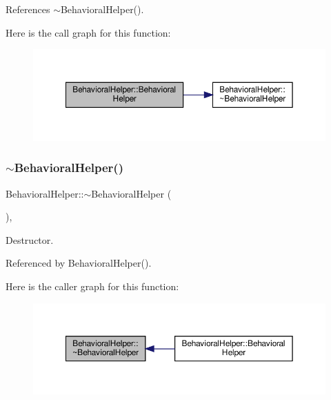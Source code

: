 References $\sim$\+Behavioral\+Helper().

Here is the call graph for this function\+:
\nopagebreak
\begin{figure}[H]
\begin{center}
\leavevmode
\includegraphics[width=350pt]{dd/db2/classBehavioralHelper_ac80988de2f81cb9392beae59b1068542_cgraph}
\end{center}
\end{figure}
\mbox{\label{classBehavioralHelper_a5cf976c4c31781dc5348f829f2ee734d}} 
\subsubsection{\texorpdfstring{$\sim$\+Behavioral\+Helper()}{~BehavioralHelper()}}
{\footnotesize\ttfamily Behavioral\+Helper\+::$\sim$\+Behavioral\+Helper (\begin{DoxyParamCaption}{ }\end{DoxyParamCaption})\hspace{0.3cm}{\ttfamily [virtual]}, {\ttfamily [default]}}



Destructor. 



Referenced by Behavioral\+Helper().

Here is the caller graph for this function\+:
\nopagebreak
\begin{figure}[H]
\begin{center}
\leavevmode
\includegraphics[width=350pt]{dd/db2/classBehavioralHelper_a5cf976c4c31781dc5348f829f2ee734d_icgraph}
\end{center}
\end{figure}


